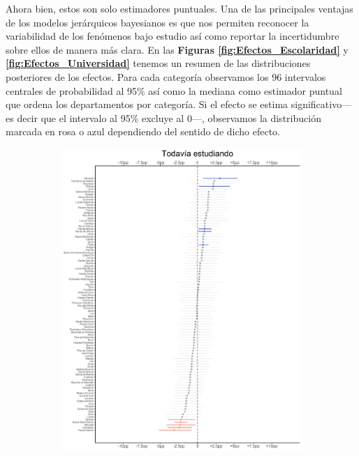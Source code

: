 Ahora bien, estos son solo estimadores puntuales. Una de las principales ventajas de los modelos jerárquicos bayesianos es que nos permiten reconocer la variabilidad de los fenómenos bajo estudio así como reportar la incertidumbre sobre ellos de manera más clara. En las \textbf{Figuras \ref{fig:Efectos_Escolaridad}} y \textbf{\ref{fig:Efectos_Universidad}} tenemos un resumen de las distribuciones posteriores de los efectos. Para cada categoría observamos los 96 intervalos centrales de probabilidad al 95\% así como la mediana como estimador puntual que ordena los departamentos por categoría. Si el efecto se estima significativo--- es decir que el intervalo al 95\% excluye al 0---, observamos la distribución marcada en rosa o azul dependiendo del sentido de dicho efecto.\\

\begin{figure}
	\centering
	\begin{subfigure}{0.45\textwidth}
	\includegraphics[width = \textwidth]{Figs/Efectos/Efectos_Esc_Modelo_H}
	\end{subfigure}

\end{figure}
